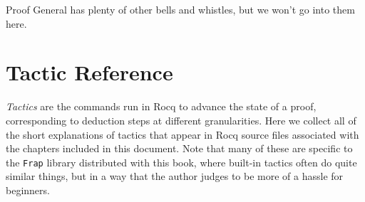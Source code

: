 \documentclass{amsbook}
\theoremstyle{definition}
\theoremstyle{remark}
\numberwithin{section}{chapter}
\numberwithin{equation}{chapter}
\begin{document}
Proof General has plenty of other bells and whistles, but we won't go into them here.

\section{Tactic Reference}

\emph{Tactics} are the commands run in Rocq to advance the state of a proof, corresponding to deduction steps at different granularities.
Here we collect all of the short explanations of tactics that appear in Rocq source files associated with the chapters included in this document.
Note that many of these are specific to the \texttt{Frap} library distributed with this book, where built-in tactics often do quite similar things, but in a way that the author judges to be more of a hassle for beginners.
\end{document}
